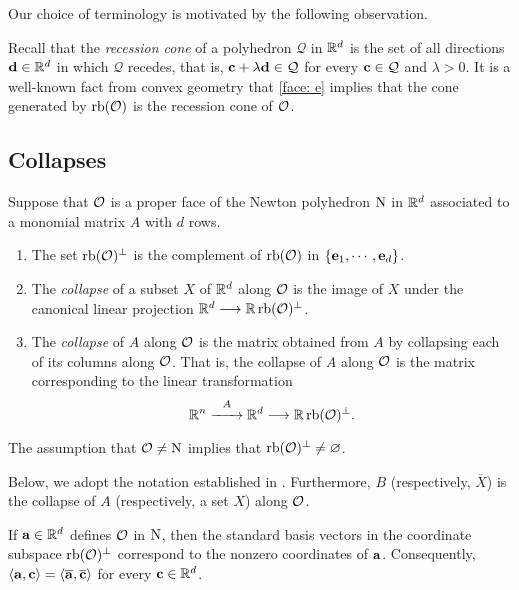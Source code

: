 \documentclass[11pt]{amsart}
\renewcommand{\!}[1]{{\color{red}\text{$\star$\,}#1\,$\star$}}
\newcommand{\ol}[1]{\overline{#1}}
\begin{document}
Our choice of terminology is motivated by the following observation.

\begin{remark}  Recall that the \emph{recession cone} of a polyhedron $\mathcal{Q}$ in $\mathbb{R}^d$ is the set of all directions $\mathbf{d} \in \mathbb{R}^d$ in which $\mathcal{Q}$ recedes, that is, $\mathbf{c} + \lambda \mathbf{d} \in \mathcal{Q}$ for every $\mathbf{c} \in \mathcal{Q}$ and $\lambda > 0$.  It is a well-known fact from convex geometry that  \eqref{face: e} implies that the cone generated by $\operatorname{rb}(\mathcal{O})$ is the recession cone of $\mathcal{O}$.
\end{remark}

\subsection{Collapses} 

\begin{definition}  
\label{collapse: D}
 Suppose that $\mathcal{O}$ is a proper face of the Newton polyhedron $\mathrm{N}$ in $\mathbb{R}^d$ associated to a monomial matrix $A$ with $d$ rows.  

\begin{enumerate}
\item The set $\operatorname{rb}(\mathcal{O})^{\perp}$ is the complement of $\operatorname{rb}(\mathcal{O})$ in $\{ \mathbf{e}_1, \cdots, \mathbf{e}_d \}$.
\item The \emph{collapse} of a subset $X$ of $\mathbb{R}^d$ along $\mathcal{O}$ is the image of $X$ under the canonical linear projection $\mathbb{R}^d \longrightarrow \mathbb{R} \operatorname{rb}(\mathcal{O})^{\perp}$.
\item The \emph{collapse} of $A$ along $\mathcal{O}$ is the matrix obtained from $A$ by collapsing each of its columns along $\mathcal{O}$.  That is, the collapse of $A$ along $\mathcal{O}$ is the matrix corresponding to the linear transformation  
%
\[ \mathbb{R}^n \stackrel{A}{\xrightarrow{\hspace*{6mm}}} \mathbb{R}^d \longrightarrow \mathbb{R} \operatorname{rb}(\mathcal{O})^{\perp}.\]  
%
\end{enumerate}
\end{definition}     

\begin{remark}  The assumption that $\mathcal{O} \neq \mathrm{N}$ implies that $\operatorname{rb}(\mathcal{O})^{\perp} \neq \varnothing$.
\end{remark}

Below, we adopt the notation established in .  Furthermore,  $B$ (respectively, $\ol{X}$) is the collapse of $A$ (respectively, a set $X$) along $\mathcal{O}$.


\begin{remark}
\label{collapse of a defining vector: R}
If $\mathbf{a} \in \mathbb{R}^d$ defines $\mathcal{O}$ in $\mathrm{N}$, then the standard basis vectors in the coordinate subspace $\operatorname{rb}(\mathcal{O})^{\perp}$ correspond to the nonzero coordinates of $\mathbf{a}$.  Consequently, $\iprod{\vv{a}}{\vv{c}} = \iprod{\ol{\vv{a}}}{\ol{\vv{c}}}$ for every $\mathbf{c} \in \mathbb{R}^d$.
\end{remark}
\end{document}
